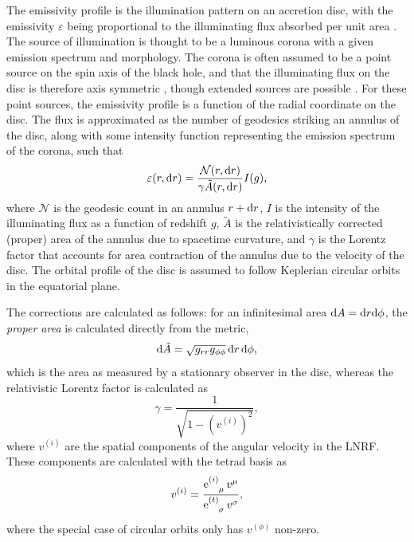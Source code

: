 The emissivity profile is the illumination pattern on an accretion disc, with the emissivity $\varepsilon$ being proportional to the illuminating flux absorbed per unit area \citep{laor_line_1991,wilkins_understanding_2012}. The source of illumination is thought to be a luminous corona with a given emission spectrum and morphology. The corona is often assumed to be a point source on the spin axis of the black hole, and that the illuminating flux on the disc is therefore axis symmetric \citep{fukumura_accretion_2007}, though extended sources are possible \citep{gonzalez_probing_2017}.  For these point sources, the emissivity profile is a function of the radial coordinate on the disc. The flux is approximated as the number of geodesics striking an annulus of the disc, along with some intensity function representing the emission spectrum of the corona, such that 
\begin{equation}
    \varepsilon (r, \text{d} r) = \frac{\mathcal{N}(r, \text{d} r)}{\gamma \tilde{A}(r, \text{d} r)} I(g),
\end{equation}
where $\mathcal{N}$ is the geodesic count in an annulus $r + \text{d} r$, $I$ is the intensity of the illuminating flux as a function of redshift $g$, $\tilde{A}$ is the relativistically corrected (proper) area of the annulus due to spacetime curvature, and $\gamma$ is the Lorentz factor that accounts for area contraction of the annulus due to the velocity of the disc. The orbital profile of the disc is assumed to follow Keplerian circular orbits in the equatorial plane.

The corrections are calculated as follows: for an infinitesimal area $\text{d} A = \text{d} r \text{d}\phi$, the \textit{proper area} is calculated directly from the metric,
\begin{equation}
    \text{d}\tilde{A} = \sqrt{g_{rr} g_{\phi\phi}}\, \text{d} r\, \text{d} \phi,
\end{equation}
which is the area as measured by a stationary observer in the disc, whereas the relativistic Lorentz factor is calculated as
\begin{equation}
    \gamma = \frac{1}{\sqrt{1 - \left(v^{(i)}\right)^2}},
\end{equation}
where $v^{(i)}$ are the spatial components of the angular velocity in the LNRF. These components are calculated with the tetrad basis as
\begin{equation}
    v^{(i)} = \frac{\utensor{\e}{(i)}{\mu}\, v^\mu}{\utensor{\e}{(t)}{\sigma}\, v^\sigma},
\end{equation}
where the special case of circular orbits only has $v^{(\phi)}$ non-zero.

